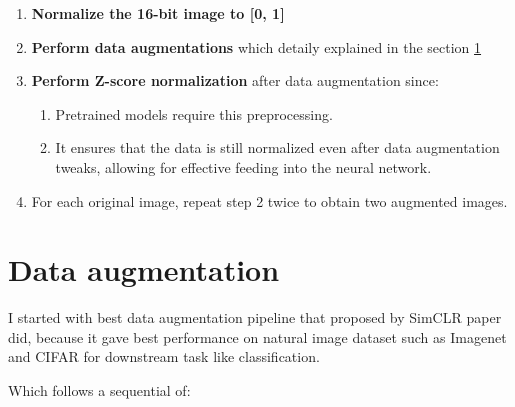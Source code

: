 \begin{enumerate}
  \item  \textbf{Normalize the 16-bit image to [0, 1]}
  
  \item \textbf{Perform data augmentations} which detaily explained in the section \ref{sec:data augmentation}

  \item \textbf{Perform Z-score normalization} after data augmentation since:
  \begin{enumerate}
      \item Pretrained models require this preprocessing.
      \item It ensures that the data is still normalized even after data augmentation tweaks, allowing for effective feeding into the neural network.
  \end{enumerate}

  \item For each original image, repeat step 2 twice to obtain two augmented images.
\end{enumerate}

\section{Data augmentation} \label{sec:data augmentation}
I started with best data augmentation pipeline that proposed by SimCLR \cite{chen2020simple} paper did,
because it gave best performance on natural image dataset such as Imagenet and CIFAR for downstream task like classification. 

Which follows a sequential of:

